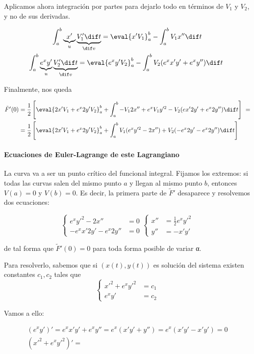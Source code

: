 \begin{problem}
Aplicamos ahora integración por partes para dejarlo todo en términos de $V_1$ y $V_2$, y no de sus derivadas. 

\begin{gather*} \int_a^b \underbrace{x'}_u \underbrace{V_1'\dif t}_{\dif v} = \eval{x'V_1}_a^b - \int_a^b V_1 x'' \dif t \\
\int_a^b \underbrace{e^xy'}_u \underbrace{V_2'\dif t}_{\dif v} = \eval{e^xy'V_2}_a^b - \int_a^b V_2(e^xx'y' + e^xy'')\dif t 
\end{gather*}

Finalmente, nos queda

\begin{align*} \tilde{F}'(0) &= \frac{1}{2} \left[ \eval{2x'V_1 + e^x2y'V_2}_a^b + \int_a^b -V_1 2 x'' + e^xV_1y'^2-V_2(ex'2y' + e^x2y'') \dif t \right] = \\
&= \frac{1}{2}\left[\eval{2x'V_1+e^x2y'V_2}_a^b + \int_a^b V_1(e^xy'^2-2x'') + V_2(-e^x2y'-e^x2y'') \dif t \right]
\end{align*}

\paragraph{Ecuaciones de Euler-Lagrange de este Lagrangiano} La curva va a ser un punto crítico del funcional integral. Fijamos los extremos: si todas las curvas salen del mismo punto $a$ y llegan al mismo punto $b$, entonces $V(a) = 0$ y $V(b) = 0$. Es decir, la primera parte de $\tilde{F}'$ desaparece y resolvemos dos ecuaciones:

\[ \begin{cases} e^xy'^2 - 2x'' &= 0 \\
-e^xx'2y' - e^x2y'' &= 0\end{cases} \begin{cases}  x'' &= \frac{1}{2}e^xy'^2 \\ 
y'' &= -x'y' \end{cases}\]

de tal forma que $\tilde{F}'(0) = 0$ para toda forma posible de variar α. 

Para resolverlo, sabemos que si $(x(t), y(t))$ es solución del sistema existen constantes $c_1, c_2$ tales que \[ \begin{cases} x'^2 + e^x y'^2&=c_1 \\
e^xy'&= c_2 \end{cases} \]

Vamos a ello:

\begin{gather*}
(e^xy')' = e^xx'y' + e^xy'' = e^x(x'y'+y'') = e^x(x'y' -x'y') = 0 \\
(x'^2 + e^xy'^2)' = 
\end{gather*}


\end{problem}

